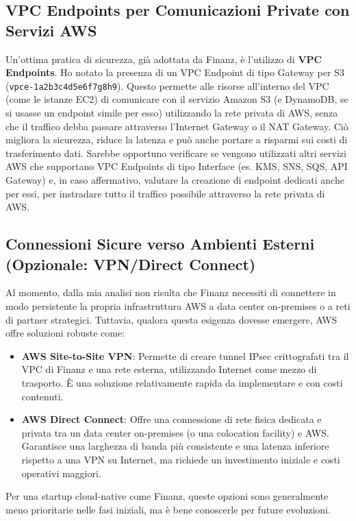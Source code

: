 \subsection{VPC Endpoints per Comunicazioni Private con Servizi AWS}
\label{subsec:vpc-endpoints_cap2}
Un'ottima pratica di sicurezza, già adottata da Finanz, è l'utilizzo di \textbf{VPC Endpoints}. Ho notato la presenza di un VPC Endpoint di tipo Gateway per S3 (\texttt{vpce-1a2b3c4d5e6f7g8h9}). Questo permette alle risorse all'interno del VPC (come le istanze EC2) di comunicare con il servizio Amazon S3 (e DynamoDB, se si usasse un endpoint simile per esso) utilizzando la rete privata di AWS, senza che il traffico debba passare attraverso l'Internet Gateway o il NAT Gateway. Ciò migliora la sicurezza, riduce la latenza e può anche portare a risparmi sui costi di trasferimento dati.
Sarebbe opportuno verificare se vengono utilizzati altri servizi AWS che supportano VPC Endpoints di tipo Interface (es. KMS, SNS, SQS, API Gateway) e, in caso affermativo, valutare la creazione di endpoint dedicati anche per essi, per instradare tutto il traffico possibile attraverso la rete privata di AWS.

\subsection{Connessioni Sicure verso Ambienti Esterni (Opzionale: VPN/Direct Connect)}
\label{subsec:vpn-directconnect_cap2}
Al momento, dalla mia analisi non risulta che Finanz necessiti di connettere in modo persistente la propria infrastruttura AWS a data center on-premises o a reti di partner strategici. Tuttavia, qualora questa esigenza dovesse emergere, AWS offre soluzioni robuste come:
\begin{itemize}
    \item \textbf{AWS Site-to-Site VPN}: Permette di creare tunnel IPsec crittografati tra il VPC di Finanz e una rete esterna, utilizzando Internet come mezzo di trasporto. È una soluzione relativamente rapida da implementare e con costi contenuti.
    \item \textbf{AWS Direct Connect}: Offre una connessione di rete fisica dedicata e privata tra un data center on-premises (o una colocation facility) e AWS. Garantisce una larghezza di banda più consistente e una latenza inferiore rispetto a una VPN su Internet, ma richiede un investimento iniziale e costi operativi maggiori.
\end{itemize}
Per una startup cloud-native come Finanz, queste opzioni sono generalmente meno prioritarie nelle fasi iniziali, ma è bene conoscerle per future evoluzioni.

